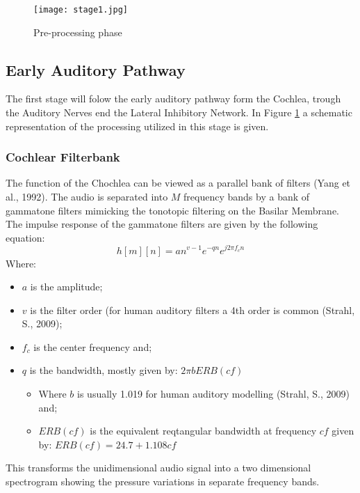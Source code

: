\documentclass{article}
\begin{document}
\begin{figure}
	\texttt{[image: stage1.jpg]}
	\caption{Pre-processing phase}
	\label{fig:stage1_1}
\end{figure}

\subsection{Early Auditory Pathway}
The first stage will folow the early auditory pathway form the Cochlea, trough the Auditory Nerves end the Lateral Inhibitory Network. In Figure \ref{fig:stage1_1} a schematic representation of the processing utilized in this stage is given.
\subsubsection{Cochlear Filterbank}
The function of the Chochlea can be viewed as a parallel bank of filters (Yang et al., 1992). The audio is separated into $M$ frequency bands by a bank of gammatone filters mimicking the tonotopic filtering on the Basilar Membrane. The impulse response of the gammatone filters are given by the following equation:
\begin{equation*}
h[m][n] = an^{v-1}e^{-qn}e^{j2\pi f_{c} n}
\end{equation*}
Where:
\begin{itemize}
	\item  $a$ is the amplitude; 
	\item $v$ is the filter order (for human auditory filters a 4th order is common (Strahl, S., 2009); 
	\item $f_{c}$ is the center frequency and;
	\item $q$ is the bandwidth, mostly given by: $2\pi b ERB(cf)$
	\begin{itemize}
		\item Where $b$ is usually 1.019 for human auditory modelling (Strahl, S., 2009) and;
		\item $ERB(cf)$ is the equivalent reqtangular bandwidth at frequency $cf$ given by: $ERB(cf) = 24.7 + 1.108 cf$
	\end{itemize}
\end{itemize}
This transforms the unidimensional audio signal into a two dimensional spectrogram showing the pressure variations in separate frequency bands.
\end{document}
